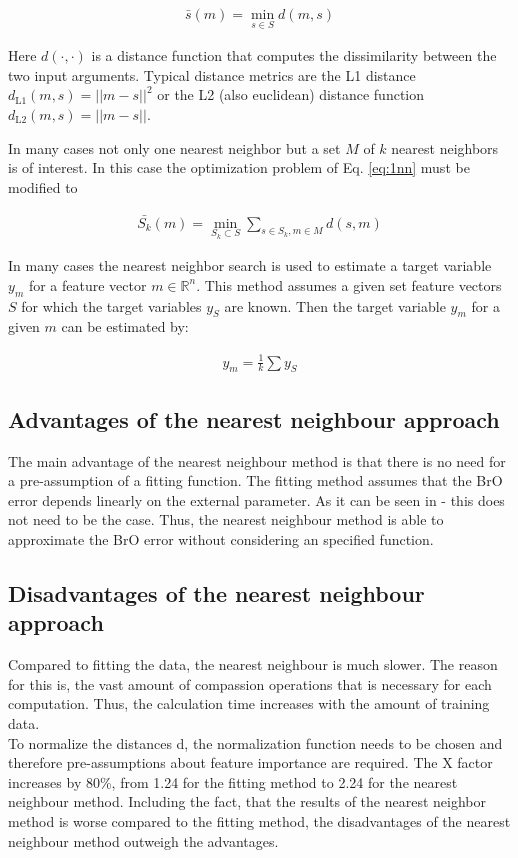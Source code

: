 \documentclass  [
  paper    = a4,
  BCOR     = 10mm,
  twoside,
  fontsize = 12pt,
  fleqn,
  toc      = bibnumbered,
  toc      = listofnumbered,
  numbers  = noendperiod,
  headings = normal,
  listof   = leveldown,
  version  = 3.03
]                                       {scrreprt}
\begin{document}
%

\begin{align}
\bar{s}(m) = \min_{s \in S} d(m, s) \label{eq:1nn}
\end{align}

%
Here $d(\cdot, \cdot)$ is a distance function that computes the dissimilarity between the two input arguments. Typical distance metrics are the L1 distance $d_{\text{L1} 	
}(m, s) = ||m - s||^2$ or the L2 (also euclidean) distance function $d_{\text{L2} 
}(m, s) = ||m - s||$. 


In many cases not only one nearest neighbor but a set $M$ of $k$ nearest neighbors is of interest. In this case the optimization problem of Eq. \ref{eq:1nn} must be modified to

%

\begin{align}
\bar{S_k}(m) = \min_{S_k \subset S} \sum_{s \in S_k, m \in M} d(s, m) \label{eq:knn}
\end{align}

%

In many cases the nearest neighbor search is used to estimate a target variable $y_m$ for a feature vector $m \in \mathbb{R}^n$. This method assumes a given set feature vectors $S$ for which the target variables $y_S$ are known. Then the target variable $y_m$ for a given $m$ can be estimated by:

%

\begin{align}
y_m = \frac{1}{k} \sum y_S \label{eq:knn_regression}
\end{align}

%

\subsection*{Advantages of the nearest neighbour approach}
	The main advantage of the nearest neighbour method is that there is no need for a pre-assumption of a fitting function. The fitting method assumes that the BrO error depends linearly  on the external parameter. As it can be seen in - this does not need to be the case. Thus, the nearest neighbour method is able to approximate the BrO error without considering an specified function.
%
\subsection*{Disadvantages of the nearest neighbour approach}
	Compared to fitting the data, the nearest neighbour is much slower. The reason for this is, the vast amount of compassion operations that is necessary for each computation. Thus, the calculation time increases with the amount of training data.\\
	To normalize the distances d, the normalization function needs to be chosen and therefore pre-assumptions about feature importance are required.
	The X factor increases by 80\%, from 1.24 for the fitting method 
	to 2.24 for the nearest neighbour method.
	Including the fact, that the results of the nearest neighbor method is worse compared to the fitting method, the disadvantages of the nearest neighbour method outweigh the advantages.
\end{document}
